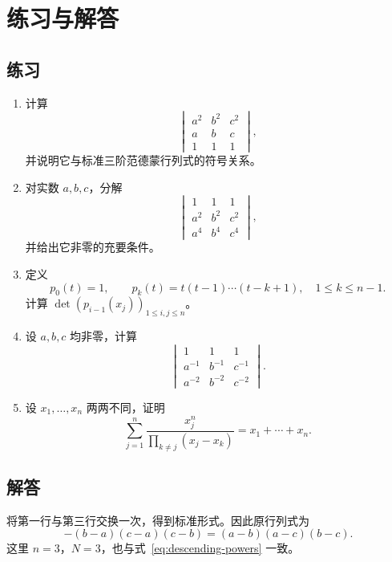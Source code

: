 \documentclass[UTF8,12pt,a4paper,fontset=fandol]{ctexart}
\begin{document}
\section{练习与解答}

\subsection{练习}

\begin{enumerate}[label=\arabic*.]
  \item\label{exercise:descending} 计算
  \[
    \begin{vmatrix}a^2&b^2&c^2\\a&b&c\\1&1&1\end{vmatrix},
  \]
  并说明它与标准三阶范德蒙行列式的符号关系。

  \item\label{exercise:squares} 对实数 $a,b,c$，分解
  \[
    \begin{vmatrix}1&1&1\\a^2&b^2&c^2\\a^4&b^4&c^4\end{vmatrix},
  \]
  并给出它非零的充要条件。

  \item\label{exercise:falling-factorials} 定义
  \[
    p_0(t)=1,\qquad p_k(t)=t(t-1)\cdots(t-k+1),\quad 1\leq k\leq n-1.
  \]
  计算 $\det(p_{i-1}(x_j))_{1\leq i,j\leq n}$。

  \item\label{exercise:reciprocal} 设 $a,b,c$ 均非零，计算
  \[
    \begin{vmatrix}1&1&1\\a^{-1}&b^{-1}&c^{-1}\\a^{-2}&b^{-2}&c^{-2}\end{vmatrix}.
  \]

  \item\label{exercise:next-moment} 设 $x_1,\ldots,x_n$ 两两不同，证明
  \[
    \sum_{j=1}^n\frac{x_j^n}{\prod_{k\ne j}(x_j-x_k)}=x_1+\cdots+x_n.
  \]
\end{enumerate}

\subsection{解答}

\begin{solve}
将第一行与第三行交换一次，得到标准形式。因此原行列式为
\[
  -(b-a)(c-a)(c-b)=(a-b)(a-c)(b-c).
\]
这里 $n=3$，$N=3$，也与式~\eqref{eq:descending-powers} 一致。
\end{solve}
\end{document}
